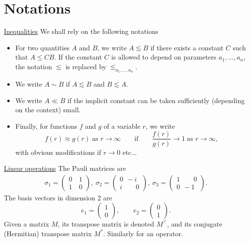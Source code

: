 \documentclass[11 pt]{amsart}
\theoremstyle{definition}
\theoremstyle{remark}
\numberwithin{equation}{section}
\begin{document}
\section{Notations}

\label{sectionnotations}

\noindent
\underline{Inequalities} We shall rely on the following notations
\begin{itemize}
\item For two quantities $A$ and $B$, we write $A \lesssim B$ if there exists a constant $C$ such that $A \leq CB$. If the constant $C$ is allowed to depend on parameters $a_1,\dots,a_n$, the notation $\lesssim$ is replaced by $\lesssim_{a_1,\dots,a_n}$.
\item We write $A \sim B$ if $A \lesssim B$ and $B \lesssim A$.
\item We write $A \ll B$ if the implicit constant can be taken sufficiently (depending on the context) small.
\item Finally, for functions $f$ and $g$ of a variable $r$, we write 
$$
f(r) \approx g(r) \; \mbox{as $r \to \infty$} \qquad \mbox{if} \qquad \frac{f(r)}{g(r)} \to 1 \; \mbox{as $r \to \infty$},
$$
with obvious modifications if $r \to 0$ etc...
\end{itemize}

\medskip

\noindent
\underline{Linear operations}
The Pauli matrices are
	\begin{equation} \label{S-v-eq4}
	\begin{split}
	\sigma_1 = 
	\left( \begin{array}{ccc}
	0 \quad 1 \\
	1 \quad 0
	\end{array} \right) , \
	\sigma_2 = 
	\left( \begin{array}{ccc}
	0 \ \ -i \\
	i \qquad 0
	\end{array} \right) ,  \
	\sigma_3 = 
	\left( \begin{array}{ccc}
	1 \qquad 0 \\
	0 \ \ -1
	\end{array} \right) . 
	\end{split}
	\end{equation}
The basis vectors in dimension $2$ are
$$
e_1 = \begin{pmatrix} 1 \\ 0 \end{pmatrix}, \qquad e_2 = \begin{pmatrix} 0 \\ 1 \end{pmatrix}.
$$
Given a matrix $M$, its transpose matrix is denoted $M^\top$, and its conjugate (Hermitian) transpose matrix $M^*$. Similarly for an operator.
\end{document}
